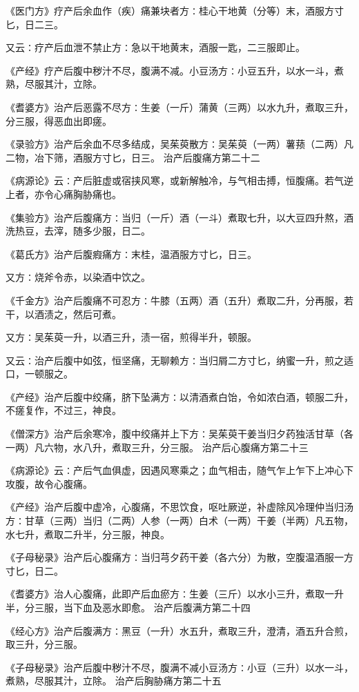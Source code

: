 \documentclass[a4paper,12pt,UTF8,twoside]{ctexbook}
\begin{document}
《医门方》疗产后余血作（疾）痛兼块者方∶桂心干地黄（分等）末，酒服方寸匕，日二三。

又云∶疗产后血泄不禁止方∶急以干地黄末，酒服一匙，二三服即止。

《产经》疗产后腹中秽汁不尽，腹满不减。小豆汤方∶小豆五升，以水一斗，煮熟，尽服其汁，立除。

《耆婆方》治产后恶露不尽方∶生姜（一斤）蒲黄（三两）以水九升，煮取三升，分三服，得恶血出即瘥。

《录验方》治产后余血不尽多结成，吴茱萸散方∶吴茱萸（一两）薯蓣（二两）凡二物，冶下筛，酒服方寸匕，日三。
治产后腹痛方第二十二

《病源论》云∶产后脏虚或宿挟风寒，或新解触冷，与气相击搏，恒腹痛。若气逆上者，亦令心痛胸胁痛也。

《集验方》治产后腹痛方∶当归（一斤）酒（一斗）煮取七升，以大豆四升熬，酒洗热豆，去滓，随多少服，日二。

《葛氏方》治产后腹瘕痛方∶末桂，温酒服方寸匕，日三。

又方∶烧斧令赤，以染酒中饮之。

《千金方》治产后腹痛不可忍方∶牛膝（五两）酒（五升）煮取二升，分再服，若干，以酒渍之，然后可煮。

又方∶吴茱萸一升，以酒三升，渍一宿，煎得半升，顿服。

又云∶治产后腹中如弦，恒坚痛，无聊赖方∶当归屑二方寸匕，纳蜜一升，煎之适口，一顿服之。

《产经》治产后腹中绞痛，脐下坠满方∶以清酒煮白饴，令如浓白酒，顿服二升，不瘥复作，不过三，神良。

《僧深方》治产后余寒冷，腹中绞痛并上下方∶吴茱萸干姜当归夕药独活甘草（各一两）凡六物，水八升，煮取三升，分三服。
治产后心腹痛方第二十三

《病源论》云∶产后气血俱虚，因遇风寒乘之；血气相击，随气乍上乍下上冲心下攻腹，故令心腹痛。

《产经》治产后腹中虚冷，心腹痛，不思饮食，呕吐厥逆，补虚除风冷理仲当归汤方∶甘草（三两）当归（二两）人参（一两）白术（一两）干姜（半两）凡五物，水七升，煮取二升半，分三服，神良。

《子母秘录》治产后心腹痛方∶当归芎夕药干姜（各六分）为散，空腹温酒服一方寸匕，日二。

《耆婆方》治人心腹痛，此即产后血瘀方∶生姜（三斤）以水小三升，煮取一升半，分三服，当下血及恶水即愈。
治产后腹满方第二十四

《经心方》治产后腹满方∶黑豆（一升）水五升，煮取三升，澄清，酒五升合煎，取三升，分三服。

《子母秘录》治产后腹中秽汁不尽，腹满不减小豆汤方∶小豆（三升）以水一斗，煮熟，尽服其汁，立除。
治产后胸胁痛方第二十五
\end{document}
